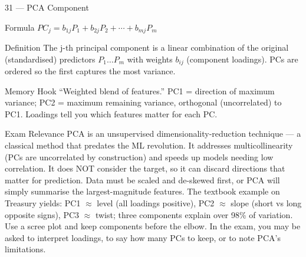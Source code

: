 \documentclass[aspectratio=169,8pt]{beamer}
\begin{document}
	\begin{frame}{31 --- PCA Component}
		\begin{block}{Formula}
			$PC_j = b_{1j}P_1 + b_{2j}P_2 + \cdots + b_{mj}P_m$
		\end{block}
		\begin{block}{Definition}
			The j-th principal component is a linear combination of the original (standardised) predictors $P_1 \dots P_m$ with weights $b_{ij}$ (component loadings). PCs are ordered so the first captures the most variance.
		\end{block}
		\begin{block}{Memory Hook}
			``Weighted blend of features.'' PC1 = direction of maximum variance; PC2 = maximum remaining variance, orthogonal (uncorrelated) to PC1. Loadings tell you which features matter for each PC.
		\end{block}
		\begin{block}{Exam Relevance}
			PCA is an unsupervised dimensionality-reduction technique --- a classical method that predates the ML revolution. It addresses multicollinearity (PCs are uncorrelated by construction) and speeds up models needing low correlation. It does NOT consider the target, so it can discard directions that matter for prediction. Data must be scaled and de-skewed first, or PCA will simply summarise the largest-magnitude features. The textbook example on Treasury yields: PC1 $\approx$ level (all loadings positive), PC2 $\approx$ slope (short vs long opposite signs), PC3 $\approx$ twist; three components explain over 98\% of variation. Use a scree plot and keep components before the elbow. In the exam, you may be asked to interpret loadings, to say how many PCs to keep, or to note PCA's limitations.
		\end{block}
	\end{frame}
	
\end{document}
